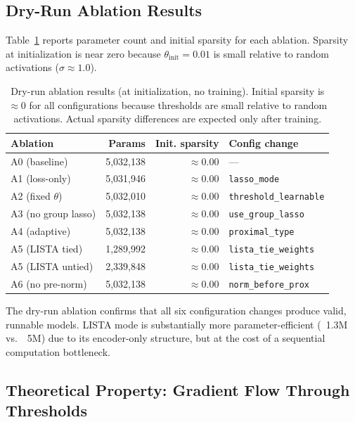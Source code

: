 \documentclass{article}
\begin{document}
\subsection{Dry-Run Ablation Results}

Table~\ref{tab:ablation} reports parameter count and initial sparsity for
each ablation. Sparsity at initialization is near zero because
$\theta_{\text{init}} = 0.01$ is small relative to random activations
($\sigma \approx 1.0$).

\begin{table}[h]
\centering
\caption{Dry-run ablation results (at initialization, no training).
         Initial sparsity is $\approx 0$ for all configurations because
         thresholds are small relative to random activations.
         Actual sparsity differences are expected only after training.}
\label{tab:ablation}
\begin{tabular}{lrrl}
\toprule
Ablation & Params & Init. sparsity & Config change \\
\midrule
A0 (baseline) & 5,032,138 & $\approx 0.00$ & --- \\
A1 (loss-only) & 5,031,946 & $\approx 0.00$ & \texttt{lasso\_mode} \\
A2 (fixed $\theta$) & 5,032,010 & $\approx 0.00$ & \texttt{threshold\_learnable} \\
A3 (no group lasso) & 5,032,138 & $\approx 0.00$ & \texttt{use\_group\_lasso} \\
A4 (adaptive) & 5,032,138 & $\approx 0.00$ & \texttt{proximal\_type} \\
A5 (LISTA tied) & 1,289,992 & $\approx 0.00$ & \texttt{lista\_tie\_weights} \\
A5 (LISTA untied) & 2,339,848 & $\approx 0.00$ & \texttt{lista\_tie\_weights} \\
A6 (no pre-norm) & 5,032,138 & $\approx 0.00$ & \texttt{norm\_before\_prox} \\
\bottomrule
\end{tabular}
\end{table}

The dry-run ablation confirms that all six configuration changes produce valid,
runnable models. LISTA mode is substantially more parameter-efficient (~1.3M
vs.\ ~5M) due to its encoder-only structure, but at the cost of a sequential
computation bottleneck.

\subsection{Theoretical Property: Gradient Flow Through Thresholds}
\end{document}
